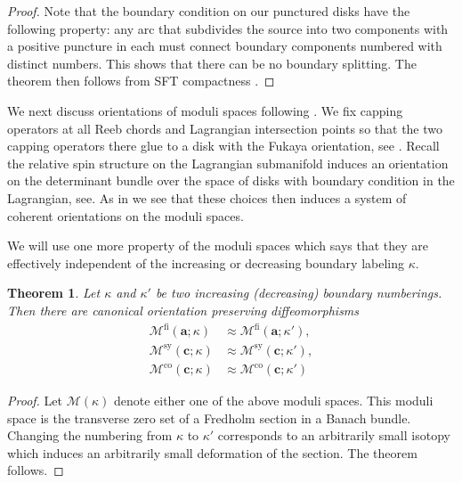 \documentclass{gtpart}
\newtheorem{thm}{Theorem}
\renewcommand{\co}{\mathrm{co}}
\newcommand{\fl}{\mathrm{fi}}
\newcommand{\sy}{\mathrm{sy}}
\begin{document}
\begin{proof}
Note that the boundary condition on our punctured disks have the following property: any arc that subdivides the source into two components with a positive puncture in each must connect boundary components numbered with distinct numbers. This shows that there can be no boundary splitting. The theorem then follows from SFT compactness \cite{BEHWZ}.
\end{proof}

We next discuss orientations of moduli spaces following \cite{EESori}. We fix capping operators at
all Reeb chords and Lagrangian intersection points so that the two capping operators there glue to a
disk with the Fukaya orientation, see \cite{FOOO}. Recall the relative spin structure on the Lagrangian submanifold induces an orientation on the determinant bundle over the space of disks with boundary condition in the Lagrangian, see. As in \cite{EESori} we see that these choices then induces a system of coherent orientations on the moduli spaces.


We will use one more property of the moduli spaces which says that they are effectively independent of the increasing or decreasing boundary labeling $\kappa$.

\begin{thm}\label{thm:mdlicopies}
Let $\kappa$ and $\kappa'$ be two increasing (decreasing) boundary numberings. Then there are canonical orientation preserving diffeomorphisms 
\begin{align*}
\mathcal{M}^{\fl}(\mathbf{a};\kappa)&\approx \mathcal{M}^{\fl}(\mathbf{a};\kappa'),\\
\mathcal{M}^{\sy}(\mathbf{c};\kappa)&\approx \mathcal{M}^{\sy}(\mathbf{c};\kappa'),\\
\mathcal{M}^{\co}(\mathbf{c};\kappa)&\approx \mathcal{M}^{\co}(\mathbf{c};\kappa')
\end{align*}
\end{thm}

\begin{proof}
Let $\mathcal{M}(\kappa)$ denote either one of the above moduli spaces. This moduli space is the transverse zero set of a Fredholm section in a Banach bundle. Changing the numbering from $\kappa$ to $\kappa'$ corresponds to an arbitrarily small isotopy which induces an arbitrarily small deformation of the section. The theorem follows. 
\end{proof}
\end{document}
